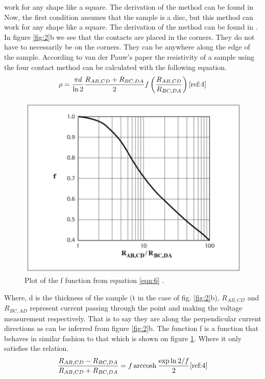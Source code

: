 \documentclass[twocolumn]{article}
\DeclareMathOperator{\arccosh}{arccosh}
\begin{document}
work for any shape like a square. The derivation of the method can be found in 
\cite{ref:3}
Now, the first condition assumes that the sample is a disc, but this method can 
work for any shape like a square. The derivation of the method can be found in 
\cite{ref:3}. In figure \ref{fig:2}b we see that the contacts are placed in the 
corners. They do not have to necessarily be on the corners. They can be 
anywhere along the edge of the sample. According to van der Pauw's paper the 
resistivity of a sample using the four contact method can be calculated with 
the following equation.
\begin{equation}
\rho = \frac{\pi d}{\ln{2}}\frac{R_{AB,CD}+R_{BC,DA}}{2}f\left(\frac{R_{AB,CD}}{R_{BC,DA}}\right)
\cite{ref:4}
\label{eqn:7}
\end{equation}
\begin{figure}
\includegraphics[width=\textwidth,height=3.5in]{f-function.png}
\caption{Plot of the f function from equation \ref{eqn:6} \cite{ref:3}.}
\label{fig:3}
\end{figure}
Where, d is the thickness of the sample (t in the case of fig. \ref{fig:2}b), 
$R_{AB,CD}$ and $R_{BC,AD}$ represent current passing through the point and 
making the voltage measurement respectively. That is to say they are along the 
perpendicular current directions as can be inferred from figure \ref{fig:2}b. 
The function f is a function that behaves in 
similar fashion to that which is shown on figure \ref{fig:3}. Where it only 
satisfies the relation.
\begin{equation}
\frac{R_{AB,CD}-R_{BC,DA}}{R_{AB,CD}+R_{BC,DA}} = f\arccosh{\frac{\exp{\ln{2/f}}}{2}}
\cite{ref:4}
\label{eqn:8}
\end{equation}
\end{document}
